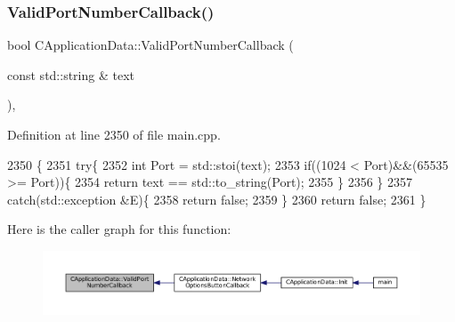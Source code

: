 \hypertarget{classCApplicationData_adc8125cc7c4ad01bdd43e6550c6ba133}{}\label{classCApplicationData_adc8125cc7c4ad01bdd43e6550c6ba133} 
\subsubsection{\texorpdfstring{Valid\+Port\+Number\+Callback()}{ValidPortNumberCallback()}}
{\footnotesize\ttfamily bool C\+Application\+Data\+::\+Valid\+Port\+Number\+Callback (\begin{DoxyParamCaption}\item[{const std\+::string \&}]{text }\end{DoxyParamCaption})\hspace{0.3cm}{\ttfamily [static]}, {\ttfamily [protected]}}



Definition at line 2350 of file main.\+cpp.


\begin{DoxyCode}
2350                                                                    \{
2351     \textcolor{keywordflow}{try}\{
2352         \textcolor{keywordtype}{int} Port = std::stoi(text);
2353         \textcolor{keywordflow}{if}((1024 < Port)&&(65535 >= Port))\{
2354             \textcolor{keywordflow}{return} text == std::to\_string(Port);
2355         \}
2356     \}
2357     \textcolor{keywordflow}{catch}(std::exception &E)\{
2358         \textcolor{keywordflow}{return} \textcolor{keyword}{false};
2359     \}
2360     \textcolor{keywordflow}{return} \textcolor{keyword}{false};
2361 \}
\end{DoxyCode}
Here is the caller graph for this function\+:\nopagebreak
\begin{figure}[H]
\begin{center}
\leavevmode
\includegraphics[width=350pt]{classCApplicationData_adc8125cc7c4ad01bdd43e6550c6ba133_icgraph}
\end{center}
\end{figure}
\hypertarget{classCApplicationData_ae3216a4fccd68c9657d7e936b1a6df67}{}\label{classCApplicationData_ae3216a4fccd68c9657d7e936b1a6df67} 
